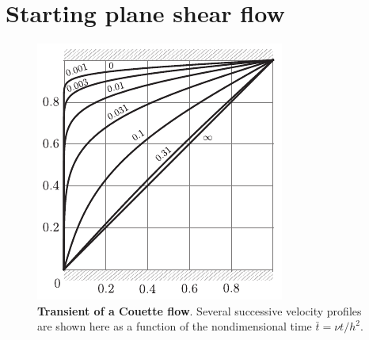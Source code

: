\documentclass[11pt,a4paper]{article}
\begin{document}
\section{Starting plane shear flow}
\begin{figure}[h]
\begin{center}
\includegraphics{transient_couette.pdf}
\end{center}
\caption{\textbf{Transient of a Couette flow}. Several successive velocity profiles are shown here as a function of the nondimensional time $\bar t = \nu t / h^2$.}
\end{figure}
\end{document}
